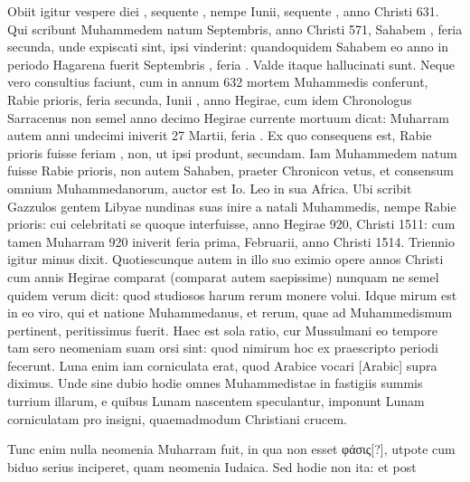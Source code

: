 Obiit igitur vespere diei ,
sequente , nempe  Iunii, sequente ,
 anno Christi 631.
Qui scribunt Muhammedem natum  Septembris, anno Christi
571, Sahabem , feria secunda, unde expiscati sint, ipsi vinderint:
quandoquidem  Sahabem eo anno in periodo Hagarena fuerit Septembris
, feria .
Valde itaque hallucinati sunt.
Neque vero
consultius faciunt, cum in annum 632 mortem Muhammedis conferunt,
 Rabie prioris, feria secunda, Iunii ,
 anno  Hegirae,
cum idem Chronologus Sarracenus non semel anno decimo Hegirae
currente mortuum dicat: Muharram autem anni undecimi iniverit
27 Martii, feria .
Ex quo consequens est,  Rabie prioris fuisse
feriam , non, ut ipsi produnt, secundam.
Iam Muhammedem
natum fuisse  Rabie prioris, non autem  Sahaben,
 praeter Chronicon
vetus, et consensum omnium Muhammedanorum, auctor est
Io.
Leo in sua Africa.
Ubi scribit Gazzulos gentem Libyae nundinas
suas inire a natali Muhammedis, nempe  Rabie prioris: cui celebritati
se quoque interfuisse, anno Hegirae 920, Christi 1511: cum
tamen Muharram 920 iniverit feria prima,  Februarii, anno
Christi 1514.
Triennio igitur minus dixit.
Quotiescunque autem in
illo suo eximio opere annos Christi cum annis Hegirae comparat (comparat
autem saepissime) nunquam ne semel quidem verum dicit:
quod studiosos harum rerum monere volui.
Idque mirum est in eo
viro, qui et natione Muhammedanus, et rerum, quae ad Muhammedismum
pertinent, peritissimus fuerit.
Haec est sola ratio, cur Mussulmani
eo tempore tam sero neomeniam suam orsi sint: quod nimirum
hoc ex praescripto periodi fecerunt.
Luna enim iam corniculata
erat, quod Arabice vocari \textarabic{[Arabic]} supra diximus.
Unde sine dubio hodie
omnes Muhammedistae in fastigiis summis turrium illarum, e quibus
Lunam nascentem speculantur, imponunt Lunam corniculatam
pro insigni, quaemadmodum
Christiani crucem.
%
\begin{table}[tp]

\end{table}
%
Tunc enim nulla neomenia
Muharram fuit, in qua
non esset \textgreek{φάσις[?]}, utpote cum
biduo serius inciperet,
quam neomenia Iudaica.
Sed hodie non ita: et post

